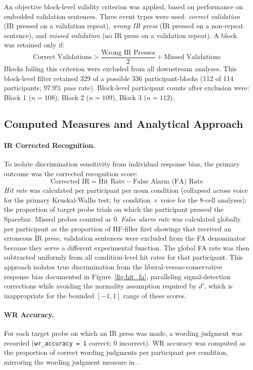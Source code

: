 \documentclass[12pt, a4paper]{article}
\begin{document}
An objective block-level validity criterion was applied, based on performance
on embedded validation sentences. Three event types were used:
\textit{correct validation} (IR pressed on a validation repeat),
\textit{wrong IR press} (IR pressed on a non-repeat sentence), and
\textit{missed validation} (no IR press on a validation repeat). A block was
retained only if:
$$
\text{Correct Validations} > \frac{\text{Wrong IR Presses}}{2} + \text{Missed Validations}
$$
Blocks failing this criterion were excluded from all downstream analyses. This
block-level filter retained 329 of a possible 336 participant-blocks
(112 of 114 participants; 97.9\% pass rate). Block-level participant counts
after exclusion were: Block 1 ($n = 108$), Block 2 ($n = 109$), Block 3
($n = 112$).

\subsection{Computed Measures and Analytical Approach}

\paragraph{IR Corrected Recognition.}
To isolate discrimination sensitivity from individual response bias, the primary
outcome was the corrected recognition score:
$$
\text{Corrected IR} = \text{Hit Rate} - \text{False Alarm (FA) Rate}
$$
\textit{Hit rate} was calculated per participant per noun condition (collapsed
across voice for the primary Kruskal-Wallis test; by condition $\times$ voice
for the 8-cell analyses): the proportion of target probe trials on which the
participant pressed the Spacebar. Missed probes counted as 0. \textit{False alarm
rate} was calculated globally per participant as the proportion of HF-filler
first showings that received an erroneous IR press; validation sentences were
excluded from the FA denominator because they serve a different experimental
function. The global FA rate was then subtracted uniformly from all
condition-level hit rates for that participant. This approach isolates true
discrimination from the liberal-versus-conservative response bias documented
in Figure~\ref{fig:hit_fa}, paralleling signal-detection corrections while
avoiding the normality assumption required by $d'$, which is inappropriate
for the bounded $[-1, 1]$ range of these scores.

\paragraph{WR Accuracy.}
For each target probe on which an IR press was made, a wording judgment was
recorded (\texttt{wr\_accuracy = 1} correct; 0 incorrect). WR accuracy was
computed as the proportion of correct wording judgments per participant per
condition, mirroring the wording judgment measure in \citet{begg1971}.
\end{document}
